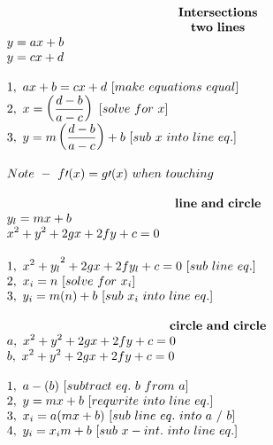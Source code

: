 \documentclass{article}
\begin{document}
\begin{multicols}{2}
\[    \]
    \columnbreak
    \noindent 
    \[
    \begin{array}{>{\displaystyle}l}
        \centerline{$\mathbf{Intersections\ }$}\\
        \centerline{$\mathbf{two\ lines\ }$}\\
        y=ax+b\\
        y=cx+d\\
        \\
        1,\ ax+b=cx+d\ [ make\ equations\ equal]\\
        2,\ x=\left(\frac{d-b}{a-c}\right) \ [ solve\ for\ x]\\
        3,\ y=m\left(\frac{d-b}{a-c}\right) +b\ [ sub\ x\ into\ line\ eq.]\\
        \\
        Note\ -\ f\prime ( x) =g\prime ( x)\ when\ touching\\
        \\
        \centerline{$\mathbf{line\ and\ circle\ }$}\\
        y_{l} =mx+b\\
        x^{2} +y^{2} +2gx+2fy+c=0\\
        \\
        {1,\ x^{2} +y_{l}}^{2} +2gx+2fy_{l} +c=0\ [ sub\ line\ eq.]\\
        2,\ x_{i} =n\ [ solve\ for\ x_{i}]\\
        3,\ y_{i} =m( n) +b\ [ sub\ x_{i} \ into\ line\ eq.]\\
        \\
        \centerline{$\mathbf{circle\ and\ circle\ }$}\\
        a,\ x^{2} +y^{2} +2gx+2fy+c=0\\
        b,\ x^{2} +y^{2} +2gx+2fy+c=0\\
        \\
        1,\ a-( b) \ [ subtract\ eq.\ b\ from\ a]\\
        2,\ y=mx+b\ [ reqwrite\ into\ line\ eq.]\\
        3,\ x_{i} =a( mx+b) \ [ sub\ line\ eq.\ into\ a\ /\ b]\\
        4,\ y_{i} =x_{i} m+b\ [ sub\ x-int.\ into\ line\ eq.]\\
        \\
    \end{array} 
    \]
\end{multicols}
\end{document}

